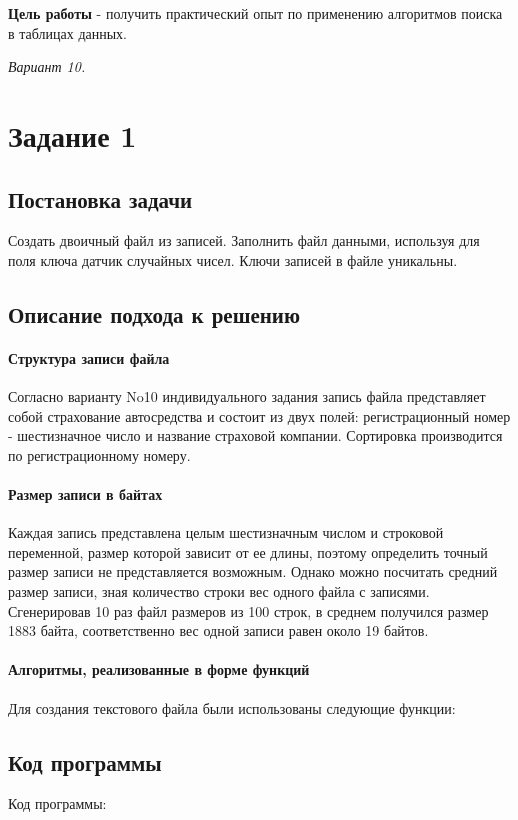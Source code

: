 \documentclass[a4paper, 14pt]{extarticle}
\begin{document}

\newpage
\tableofcontents
\newpage
\textbf{Цель работы} - получить практический опыт по применению алгоритмов поиска в
таблицах данных.

\textit{Вариант 10.}
\section{Задание 1}
\subsection{Постановка задачи}
Создать двоичный файл из записей.
Заполнить файл данными, используя для поля ключа
датчик случайных чисел. Ключи записей в файле уникальны.
\subsection{Описание подхода к решению}
\paragraph{Структура записи файла}
Согласно варианту No10 индивидуального задания запись файла представляет
собой страхование автосредства и состоит из двух полей: регистрационный номер -
шестизначное число и название страховой компании.
Сортировка производится по регистрационному номеру.
\paragraph{Размер записи в байтах}
Каждая запись представлена целым шестизначным числом и строковой
переменной, размер которой зависит от ее длины, поэтому определить точный размер
записи не представляется возможным. Однако можно посчитать средний размер записи,
зная количество строки вес одного файла с записями.
Сгенерировав 10 раз файл размеров из 100 строк, в среднем
получился размер 1883 байта, соответственно вес одной записи равен около 19 байтов.
\paragraph{Алгоритмы, реализованные в форме функций}
Для создания текстового файла были использованы следующие функции:

\subsection{Код программы}
Код программы:

\end{document}
